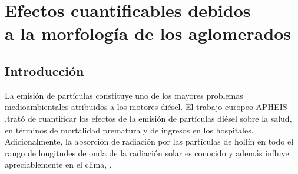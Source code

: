 %
%
%
%
%
%
%
%

\section{Efectos cuantificables debidos \\ a la morfología de los aglomerados}
\subsection{Introducción}
\par La emisión de partículas constituye uno de los mayores problemas medioambientales atribuidos a los motores diésel. El trabajo europeo APHEIS \cite{apheis:2004},trató de cuantificar los efectos de la emisión de partículas diésel sobre la salud, en términos de mortalidad prematura y de ingresos en los hospitales. Adicionalmente, la absorción de radiación por las partículas de hollín en todo el rango de longitudes de onda de la radiación solar es conocido y además influye apreciablemente en el clima, \cite{sorensen:2001}.

